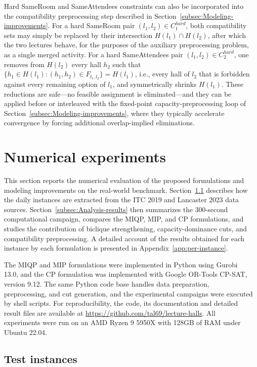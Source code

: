 \documentclass[11pt]{article}
\begin{document}
Hard SameRoom and SameAttendees constraints can also be incorporated into the compatibility preprocessing step described in Section~\ref{subsec:Modeling-improvements}. For a hard SameRoom pair $(l_1,l_2)\in C_1^{hard}$, both compatibility sets may simply be replaced by their intersection $H(l_1)\cap H(l_2)$, after which the two lectures behave, for the purposes of the auxiliary preprocessing problem, as a single merged activity. For a hard SameAttendees pair $(l_1,l_2)\in C_2^{hard}$, one removes from $H(l_2)$ every hall $h_2$ such that $\{h_1 \in H(l_1) : (h_1,h_2)\in F_{l_1,l_2}\} = H(l_1)$, i.e., every hall of $l_2$ that is forbidden against every remaining option of $l_1$, and symmetrically shrinks $H(l_1)$. These reductions are safe---no feasible assignment is eliminated---and they can be applied before or interleaved with the fixed-point capacity-preprocessing loop of Section~\ref{subsec:Modeling-improvements}, where they typically accelerate convergence by forcing additional overlap-implied eliminations.



\section{Numerical experiments}
\label{sec:numerical-experiments}
This section reports the numerical evaluation of the proposed formulations and modeling improvements on the real-world benchmark. Section~\ref{subsec:Test-instances} describes how the daily instances are extracted from the ITC 2019 and Lancaster 2023 data sources. Section~\ref{subsec:Analysis-results} then summarizes the 300-second computational campaign, compares the MIQP, MIP, and CP formulations, and studies the contribution of biclique strengthening, capacity-dominance cuts, and compatibility preprocessing. A detailed account of the results obtained for each instance by each formulation is presented in Appendix~\ref{app:per-instance}.

The MIQP and MIP formulations were implemented in Python using Gurobi 13.0, and the CP formulation was implemented with Google OR-Tools CP-SAT, version 9.12. The same Python code base handles data preparation, preprocessing, and cut generation, and the experimental campaigns were executed by shell scripts. For reproducibility, the code, its documentation and detailed result files are available at \url{https://github.com/tal69/lecture-halls}. All experiments were run on an AMD Ryzen 9 5950X with 128GB of RAM under Ubuntu 22.04.

\subsection{Test instances}  \label{subsec:Test-instances}
\end{document}
